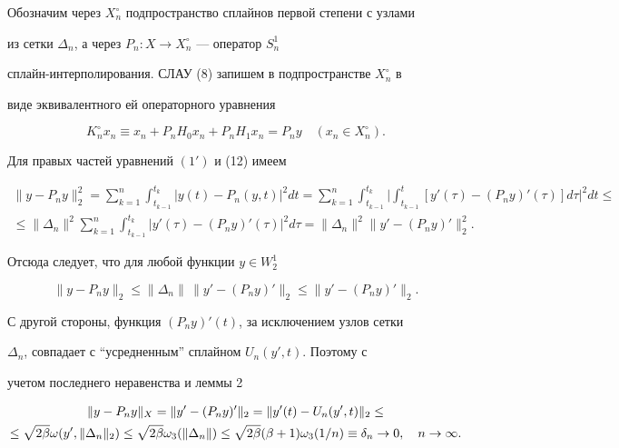  


Обозначим через $X^\circ_n$ подпространство сплайнов первой степени с узлами 


из сетки $\Delta_n$, а через $P_n:X\to X^\circ_n$ --- оператор $S^1_n$ 


сплайн-интерполирования. СЛАУ (8) запишем в подпространстве $X^\circ_n$ в 


виде эквивалентного ей операторного уравнения 


\begin{equation} 


K^\circ_n x_n\equiv x_n+P_n H_0x_n+P_n H_1x_n=P_n y\quad 


(x_n\in X^\circ_n). 


\end{equation} 


Для правых частей уравнений $(1')$ и (12) имеем 


\begin{gather*} 


\|y-P_n y\|^2_2=\sum^n_{k=1}\int^{t_k}_{t_{k-1}}|y(t)- 


P_n(y,t)|^2dt=\sum^n_{k=1}\int^{t_k}_{t_{k-1}}\bigg| 


\int^t_{t_{k-1}}[y'(\tau)-(P_n y)'(\tau)]d\tau\bigg|^2dt\le \\ 


% 


\le\|\Delta_n\|^2\sum^n_{k=1}\int^{t_k}_{t_{k-1}}|y'(\tau)- 


(P_n y)'(\tau)|^2d\tau=\|\Delta_n\|^2\|y'-(P_n y)'\|^2_2. 


\end{gather*} 


Отсюда следует, что для любой функции $y\in W^1_2$ 


$$ 


\|y-P_n y\|_2\le\|\Delta_n\|\,\|y'-(P_n y)'\|_2\le 


\|y'-(P_n y)'\|_2. 


$$ 


 


С другой стороны, функция $(P_n y)'(t)$, за исключением узлов сетки 


$\Delta_n$, совпадает с ``усредненным'' сплайном $U_n(y',t)$. Поэтому с 


учетом последнего неравенства и леммы 2 


\begin{gather} 


\|y-P_n y\|_X=\|y'-(P_n y)'\|_2=\|y'(t)-U_n(y',t)\|_2\le\notag \\ 


% 


\le\sqrt{2\beta}\omega(y',\|\Delta_n\|_2)\le\sqrt{2\beta} 


\omega_3(\|\Delta_n\|)\le\sqrt{2\beta}(\beta+1)\omega_3(1/n) 


\equiv\delta_n\to0,\quad n\to\infty. 


\end{gather} 


